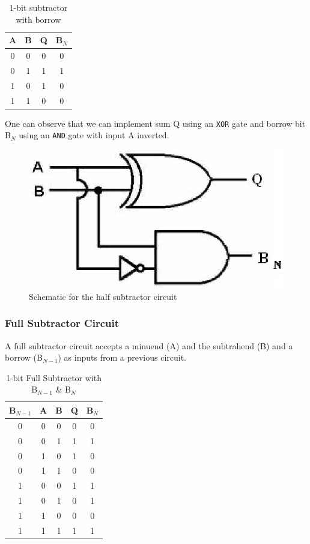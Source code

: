 \begin{table}[H]
    \centering
    \begin{tabular}{|c|c|c|c|}\hline
    A & B & Q & B$_N$ \\ \hline
    0 & 0 & 0 & 0 \\ 
    0 & 1 & 1 & 1 \\ 
    1 & 0 & 1 & 0 \\ 
    1 & 1 & 0 & 0 \\ \hline
    \end{tabular}
    \caption{1-bit subtractor with borrow}
\end{table}

One can observe that we can implement sum Q using an \verb|XOR| gate and borrow bit B$_N$ using an \verb|AND| gate with input A inverted.

\begin{figure}[H]
    \centering
    \includegraphics[width=0.4\columnwidth]{images/half-sub.png}
    \caption{Schematic for the half subtractor circuit}
    \label{half-sub}
\end{figure}

\subsubsection*{Full Subtractor Circuit}

A full subtractor circuit accepts a minuend (A) and the subtrahend (B) and a borrow (B$_{N-1}$) as inputs from a previous circuit.

\begin{table}[H]
    \centering
    \begin{tabular}{|c|c|c|c|c|}\hline
    B$_{N-1}$ & A & B & Q & B$_N$ \\ \hline
    0 & 0 & 0 & 0 & 0 \\ 
    0 & 0 & 1 & 1 & 1 \\ 
    0 & 1 & 0 & 1 & 0 \\ 
    0 & 1 & 1 & 0 & 0 \\
    1 & 0 & 0 & 1 & 1 \\ 
    1 & 0 & 1 & 0 & 1 \\ 
    1 & 1 & 0 & 0 & 0 \\ 
    1 & 1 & 1 & 1 & 1 \\ \hline
    \end{tabular}
    \caption{1-bit Full Subtractor with B$_{N-1}$ \& B$_N$}
\end{table}

